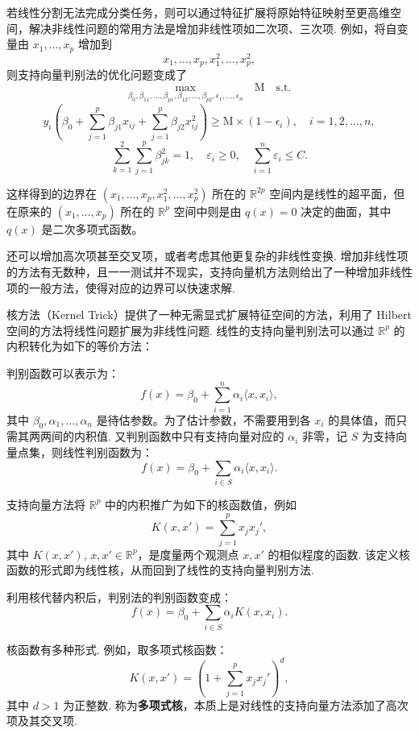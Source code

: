 \documentclass[12pt, a4paper, oneside]{ctexart}
\begin{document}
	若线性分割无法完成分类任务，则可以通过特征扩展将原始特征映射至更高维空间，解决非线性问题的常用方法是增加非线性项如二次项、三次项. 例如，将自变量由 \(x_1, \ldots, x_p\) 增加到
	\[
	x_1, \ldots, x_p, x_1^2, \ldots, x_p^2,
	\]
	则支持向量判别法的优化问题变成了
	\[
	\max_{\beta_0, \beta_{11}, \ldots, \beta_{p1}, \beta_{12}, \ldots, \beta_{p2}, \epsilon_1, \ldots, \epsilon_n} \quad \text{M} \quad \text{s.t.}
	\]
	\[
	y_i \left( \beta_0 + \sum_{j=1}^{p} \beta_{j1} x_{ij} + \sum_{j=1}^{p} \beta_{j2} x_{ij}^2 \right) \geq \text{M} \times (1 - \epsilon_i), \quad i = 1, 2, \ldots, n,
	\]
	\[
	\sum_{k=1}^{2} \sum_{j=1}^{p} \beta_{jk}^2 = 1, \quad \varepsilon_i \geq 0, \quad \sum_{i=1}^{n} \varepsilon_i \leq C.
	\]
	
	这样得到的边界在 \((x_1, \ldots, x_p, x_1^2, \ldots, x_p^2)\) 所在的 \(\mathbb{R}^{2p}\) 空间内是线性的超平面，但在原来的 \((x_1, \ldots, x_p)\) 所在的 \(\mathbb{R}^p\) 空间中则是由 \(q(x) = 0\) 决定的曲面，其中 \(q(x)\) 是二次多项式函数。
	
	还可以增加高次项甚至交叉项，或者考虑其他更复杂的非线性变换. 增加非线性项的方法有无数种，且一一测试并不现实，支持向量机方法则给出了一种增加非线性项的一般方法，使得对应的边界可以快速求解.
	
	核方法（Kernel Trick）提供了一种无需显式扩展特征空间的方法，利用了 Hilbert 空间的方法将线性问题扩展为非线性问题. 线性的支持向量判别法可以通过 \(\mathbb{R}^p\) 的内积转化为如下的等价方法：
	
	判别函数可以表示为：
	\[
	f(x) = \beta_0 + \sum_{i=1}^{n} \alpha_i \langle x, x_i \rangle,
	\]
	其中 \(\beta_0, \alpha_1, \ldots, \alpha_n\) 是待估参数。为了估计参数，不需要用到各 \(x_i\) 的具体值，而只需其两两间的内积值. 又判别函数中只有支持向量对应的 \(\alpha_i\) 非零，记 \(S\) 为支持向量点集，则线性判别函数为：
	\[
	f(x) = \beta_0 + \sum_{i \in S} \alpha_i \langle x, x_i \rangle.
	\]
	
	支持向量方法将 \(\mathbb{R}^p\) 中的内积推广为如下的核函数值，例如
	\[
	K(x, x') = \sum_{j=1}^{p} x_j x_j',
	\]
	其中 \(K(x, x')\), \(x, x' \in \mathbb{R}^p\)，是度量两个观测点 \(x, x'\) 的相似程度的函数. 该定义核函数的形式即为线性核，从而回到了线性的支持向量判别方法.
	
	利用核代替内积后，判别法的判别函数变成：
	\[
	f(x) = \beta_0 + \sum_{i \in S} \alpha_i K(x, x_i).
	\]
	
	核函数有多种形式. 例如，取多项式核函数：
	\[
	K(x, x') = \left( 1 + \sum_{j=1}^{p} x_j x_j' \right)^d,
	\]
	其中 \(d > 1\) 为正整数. 称为\textbf{多项式核}，本质上是对线性的支持向量方法添加了高次项及其交叉项.
	
\end{document}
